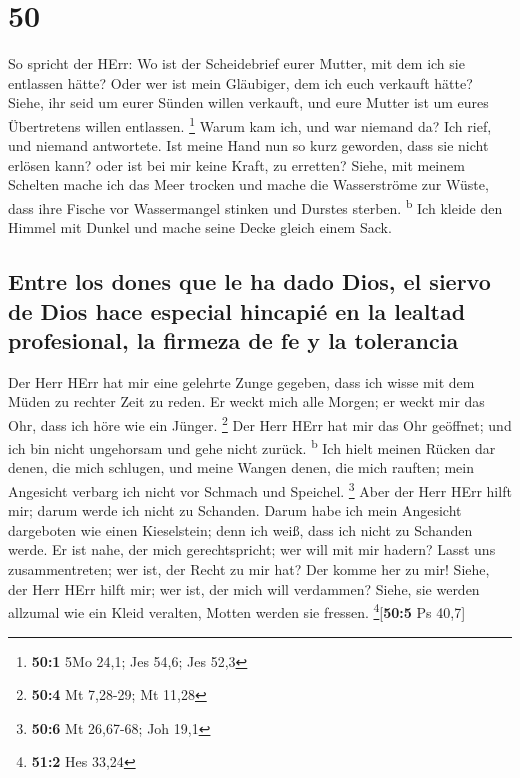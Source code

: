 \hypertarget{section-49}{%
\section{50}\label{section-49}}

 So spricht der HErr: Wo ist der Scheidebrief eurer
Mutter, mit dem ich sie entlassen hätte? Oder wer ist mein Gläubiger,
dem ich euch verkauft hätte? Siehe, ihr seid um eurer Sünden willen
verkauft, und eure Mutter ist um eures Übertretens willen entlassen.
\footnote{\textbf{50:1} 5Mo 24,1; Jes 54,6; Jes 52,3} 
Warum kam ich, und war niemand da? Ich rief, und niemand antwortete. Ist
meine Hand nun so kurz geworden, dass sie nicht erlösen kann? oder ist
bei mir keine Kraft, zu erretten? Siehe, mit meinem Schelten mache ich
das Meer trocken und mache die Wasserströme zur Wüste, dass ihre Fische
vor Wassermangel stinken und Durstes sterben. \textsuperscript{b}
 Ich kleide den Himmel mit Dunkel und mache seine Decke
gleich einem Sack.

\hypertarget{entre-los-dones-que-le-ha-dado-dios-el-siervo-de-dios-hace-especial-hincapiuxe9-en-la-lealtad-profesional-la-firmeza-de-fe-y-la-tolerancia}{%
\subsection{Entre los dones que le ha dado Dios, el siervo de Dios hace
especial hincapié en la lealtad profesional, la firmeza de fe y la
tolerancia}\label{entre-los-dones-que-le-ha-dado-dios-el-siervo-de-dios-hace-especial-hincapiuxe9-en-la-lealtad-profesional-la-firmeza-de-fe-y-la-tolerancia}}

 Der Herr HErr hat mir eine gelehrte Zunge gegeben, dass
ich wisse mit dem Müden zu rechter Zeit zu reden. Er weckt mich alle
Morgen; er weckt mir das Ohr, dass ich höre wie ein Jünger. \footnote{\textbf{50:4}
  Mt 7,28-29; Mt 11,28}  Der Herr HErr hat mir das Ohr
geöffnet; und ich bin nicht ungehorsam und gehe nicht zurück.
\textsuperscript{b}  Ich hielt meinen Rücken dar denen,
die mich schlugen, und meine Wangen denen, die mich rauften; mein
Angesicht verbarg ich nicht vor Schmach und Speichel. \footnote{\textbf{50:6}
  Mt 26,67-68; Joh 19,1}  Aber der Herr HErr hilft mir;
darum werde ich nicht zu Schanden. Darum habe ich mein Angesicht
dargeboten wie einen Kieselstein; denn ich weiß, dass ich nicht zu
Schanden werde.  Er ist nahe, der mich gerechtspricht; wer
will mit mir hadern? Lasst uns zusammentreten; wer ist, der Recht zu mir
hat? Der komme her zu mir!  Siehe, der Herr HErr hilft
mir; wer ist, der mich will verdammen? Siehe, sie werden allzumal wie
ein Kleid veralten, Motten werden sie fressen.
\footnote{\textbf{51:2} Hes 33,24}{[}\textbf{50:5} Ps 40,7{]}

